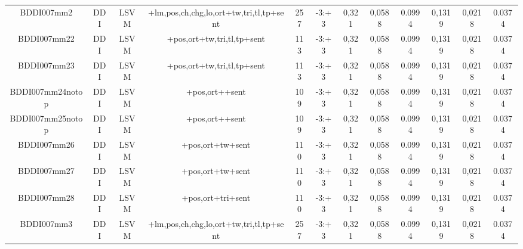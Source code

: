 \documentclass[a4paper]{article}
\begin{document}
\begin{landscape}
\begin{center}
\begin{tabular}{ |c|c|c|c|c|c|c|c|c|c|c|c|}
 
 	
 	\small{ BDDI007mm2 } & \small{ DDI} & \small{  LSVM }  & +lm,pos,ch,chg,lo,ort+tw,tri,tl,tp+sent  &  257 &  \small{  -3:+3 }  &  0,321 & 0,0588 & 0.0994  &  0,1319 & 0,0218 & 0.0374 \\
 	

 
 	
 	\small{ BDDI007mm22 } & \small{ DDI} & \small{  LSVM }  & +pos,ort+tw,tri,tl,tp+sent  &  113 &  \small{  -3:+3 }  &  0,321 & 0,0588 & 0.0994  &  0,1319 & 0,0218 & 0.0374 \\
 	

 
 	
 	\small{ BDDI007mm23 } & \small{ DDI} & \small{  LSVM }  & +pos,ort+tw,tri,tl,tp+sent  &  113 &  \small{  -3:+3 }  &  0,321 & 0,0588 & 0.0994  &  0,1319 & 0,0218 & 0.0374 \\
 	

 
 	
 	\small{ BDDI007mm24notop } & \small{ DDI} & \small{  LSVM }  & +pos,ort++sent  &  109 &  \small{  -3:+3 }  &  0,321 & 0,0588 & 0.0994  &  0,1319 & 0,0218 & 0.0374 \\
 	

 
 	
 	\small{ BDDI007mm25notop } & \small{ DDI} & \small{  LSVM }  & +pos,ort++sent  &  109 &  \small{  -3:+3 }  &  0,321 & 0,0588 & 0.0994  &  0,1319 & 0,0218 & 0.0374 \\
 	

 
 	
 	\small{ BDDI007mm26 } & \small{ DDI} & \small{  LSVM }  & +pos,ort+tw+sent  &  110 &  \small{  -3:+3 }  &  0,321 & 0,0588 & 0.0994  &  0,1319 & 0,0218 & 0.0374 \\
 	

 
 	
 	\small{ BDDI007mm27 } & \small{ DDI} & \small{  LSVM }  & +pos,ort+tw+sent  &  110 &  \small{  -3:+3 }  &  0,321 & 0,0588 & 0.0994  &  0,1319 & 0,0218 & 0.0374 \\
 	

 
 	
 	\small{ BDDI007mm28 } & \small{ DDI} & \small{  LSVM }  & +pos,ort+tri+sent  &  110 &  \small{  -3:+3 }  &  0,321 & 0,0588 & 0.0994  &  0,1319 & 0,0218 & 0.0374 \\
 	

 
 	
 	\small{ BDDI007mm3 } & \small{ DDI} & \small{  LSVM }  & +lm,pos,ch,chg,lo,ort+tw,tri,tl,tp+sent  &  257 &  \small{  -3:+3 }  &  0,321 & 0,0588 & 0.0994  &  0,1319 & 0,0218 & 0.0374 \\
 	


\end{tabular}
\end{center}
\end{landscape}
\end{document}
